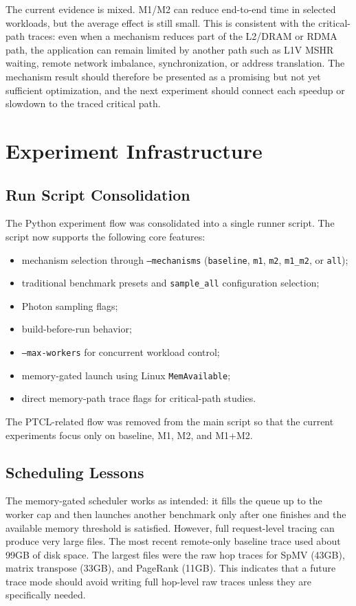 \documentclass[sigconf,screen,review]{acmart}
\begin{document}
The current evidence is mixed.  M1/M2 can reduce end-to-end time in selected
workloads, but the average effect is still small.  This is consistent with the
critical-path traces: even when a mechanism reduces part of the L2/DRAM or
RDMA path, the application can remain limited by another path such as L1V
MSHR waiting, remote network imbalance, synchronization, or address
translation.  The mechanism result should therefore be presented as a
promising but not yet sufficient optimization, and the next experiment should
connect each speedup or slowdown to the traced critical path.

\section{Experiment Infrastructure}

\subsection{Run Script Consolidation}

The Python experiment flow was consolidated into a single runner script.  The
script now supports the following core features:

\begin{itemize}
  \item mechanism selection through \texttt{--mechanisms}
  (\texttt{baseline}, \texttt{m1}, \texttt{m2}, \texttt{m1\_m2}, or
  \texttt{all});
  \item traditional benchmark presets and \texttt{sample\_all} configuration
  selection;
  \item Photon sampling flags;
  \item build-before-run behavior;
  \item \texttt{--max-workers} for concurrent workload control;
  \item memory-gated launch using Linux \texttt{MemAvailable};
  \item direct memory-path trace flags for critical-path studies.
\end{itemize}

The PTCL-related flow was removed from the main script so that the current
experiments focus only on baseline, M1, M2, and M1+M2.

\subsection{Scheduling Lessons}

The memory-gated scheduler works as intended: it fills the queue up to the
worker cap and then launches another benchmark only after one finishes and the
available memory threshold is satisfied.  However, full request-level tracing
can produce very large files.  The most recent remote-only baseline trace used
about 99GB of disk space.  The largest files were the raw hop traces for SpMV
(43GB), matrix transpose (33GB), and PageRank (11GB).  This indicates that a
future trace mode should avoid writing full hop-level raw traces unless they
are specifically needed.
\end{document}
